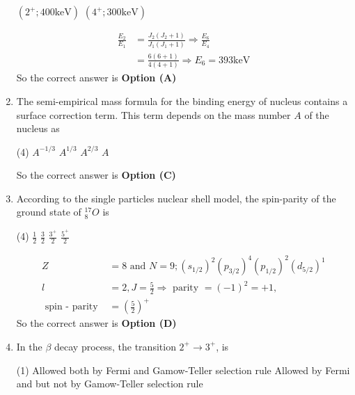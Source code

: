 \begin{enumerate}
\begin{tasks}
\task[\textbf{C.}] $\left(2^{+} ; 400 \mathrm{keV}\right)$
\task[\textbf{D.}] $\left(4^{+} ; 300 \mathrm{keV}\right)$
\end{tasks}
\begin{answer}
\begin{align*}
\frac{E_{2}}{E_{1}}&=\frac{J_{2}\left(J_{2}+1\right)}{J_{1}\left(J_{1}+1\right)} \Rightarrow \frac{E_{6}}{E_{4}}\\&=\frac{6(6+1)}{4(4+1)} \Rightarrow E_{6}=393 \mathrm{keV}
\end{align*}
So the correct answer is \textbf{Option (A)}
\end{answer}
\item The semi-empirical mass formula for the binding energy of nucleus contains a surface correction term. This term depends on the mass number $A$ of the nucleus as
{}
\begin{tasks}(4)
\task[\textbf{A.}] $A^{-1 / 3}$
\task[\textbf{B.}] $A^{1 / 3}$
\task[\textbf{C.}]  $A^{2 / 3}$
\task[\textbf{D.}] $A$
\end{tasks}
\begin{answer}
So the correct answer is \textbf{Option (C)}
\end{answer}
\item According to the single particles nuclear shell model, the spin-parity of the ground state of ${ }_{8}^{17} O$ is
{}
\begin{tasks}(4)
\task[\textbf{A.}] $\frac{1}{2}$
\task[\textbf{B.}] $\frac{3}{2}$
\task[\textbf{C.}] $\frac{3^{+}}{2}$
\task[\textbf{D.}] $\frac{5^{+}}{2}$
\end{tasks}
\begin{answer}
\begin{align*}
Z&=8\text{ and }N=9 ;\left(s_{1 / 2}\right)^{2}\left(p_{3 / 2}\right)^{4}\left(p_{1 / 2}\right)^{2}\left(d_{5 / 2}\right)^{1}\\
l&=2, J=\frac{5}{2} \Rightarrow\text{ parity }=(-1)^{2}=+1, \\\text{ spin - parity } &=\left(\frac{5}{2}\right)^{+}
\end{align*}
So the correct answer is \textbf{Option (D)}
\end{answer}
\item In the $\beta$ decay process, the transition $2^{+} \rightarrow 3^{+}$, is
{}
\begin{tasks}(1)
\task[\textbf{A.}] Allowed both by Fermi and Gamow-Teller selection rule
\task[\textbf{B.}]  Allowed by Fermi and but not by Gamow-Teller selection rule

\end{tasks}
\end{enumerate}
